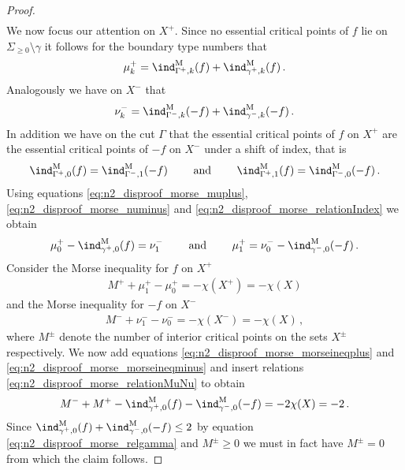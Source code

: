 \begin{proof}
\begin{align}
  \end{align}
  We now focus our attention on $X^+$. Since no essential critical points of $f$ lie on $\Sigma_{\geq0}\setminus\gamma$
  it follows for the boundary type numbers that
  \begin{align}
    \mu^+_k=\ind^\text{M}_{\Gamma^+,k}(f)+\ind^\text{M}_{\gamma^+,k}(f)\,.\label{eq:n2_disproof_morse_muplus}
  \end{align}
  Analogously we have on $X^-$ that
  \begin{align}
    \nu^-_k=\ind^\text{M}_{\Gamma^-,k}(-f)+\ind^\text{M}_{\gamma^-,k}(-f)\,.\label{eq:n2_disproof_morse_numinus}
  \end{align}
  In addition we have on the cut $\Gamma$ that the essential critical points of $f$ on $X^+$ are the
  essential critical points of $-f$ on $X^-$ under a shift of index, that is
  \begin{align}
    \ind^\text{M}_{\Gamma^+,0}(f)=\ind^\text{M}_{\Gamma^-,1}(-f)\qquad\text{ and }\qquad 
    \ind^\text{M}_{\Gamma^+,1}(f)=\ind^\text{M}_{\Gamma^-,0}(-f)\,.\label{eq:n2_disproof_morse_relationIndex} 
  \end{align}
  Using equations \eqref{eq:n2_disproof_morse_muplus}, \eqref{eq:n2_disproof_morse_numinus} and \eqref{eq:n2_disproof_morse_relationIndex}
  we obtain
  \begin{align}
    \mu^+_0-\ind^\text{M}_{\gamma^+,0}(f)=\nu^-_1 \qquad\text{ and }\qquad
    \mu^+_1=\nu^-_0-\ind^\text{M}_{\gamma^-,0}(-f)\,.\label{eq:n2_disproof_morse_relationMuNu}
  \end{align}
  Consider the Morse inequality for $f$ on $X^+$
  \begin{align}
    M^++\mu^+_1-\mu^+_0=-\chi(X^+)=-\chi(X)\label{eq:n2_disproof_morse_morseineqplus}
  \end{align}
  and the Morse inequality for $-f$ on $X^-$
  \begin{align}
    M^-+\nu^-_1-\nu^-_0=-\chi(X^-)=-\chi(X)\label{eq:n2_disproof_morse_morseineqminus}\,,
  \end{align}
  where $M^\pm$ denote the number of interior critical points on the sets $X^\pm$ respectively.
  We now add equations \eqref{eq:n2_disproof_morse_morseineqplus} and \eqref{eq:n2_disproof_morse_morseineqminus}
  and insert relations \eqref{eq:n2_disproof_morse_relationMuNu} to obtain
  \begin{align*}
    M^-+M^+-\ind^\text{M}_{\gamma^+,0}(f)-\ind^\text{M}_{\gamma^-,0}(-f)=-2\chi(X)=-2\,.
  \end{align*}
  Since $\ind^\text{M}_{\gamma^+,0}(f)+\ind^\text{M}_{\gamma^-,0}(-f)\leq2$ by equation \eqref{eq:n2_disproof_morse_relgamma} and $M^\pm\geq0$ we must in fact have $M^\pm=0$ from which the claim follows.


\end{proof}
